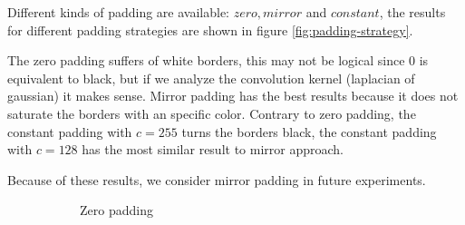 Different kinds of padding are available: $zero, mirror$ and $constant$, the results for different padding strategies are shown in figure \ref{fig:padding-strategy}.

The zero padding suffers of white borders, this may not be logical since 0 is equivalent to black, but if we analyze the convolution kernel (laplacian of gaussian) it makes sense. Mirror padding has the best results because it does not saturate the borders with an specific color. Contrary to zero padding, the constant padding with $c=255$ turns the borders black, the constant padding with $c=128$ has the most similar result to mirror approach.

Because of these results, we consider mirror padding in future experiments.

\begin{figure}[h!]
\centering
\begin{subfigure}{0.25\textwidth}
  \centering
  \caption{Zero padding}
\end{subfigure}%
\begin{subfigure}{0.25\textwidth}
  \centering

\end{subfigure}
\end{figure}
